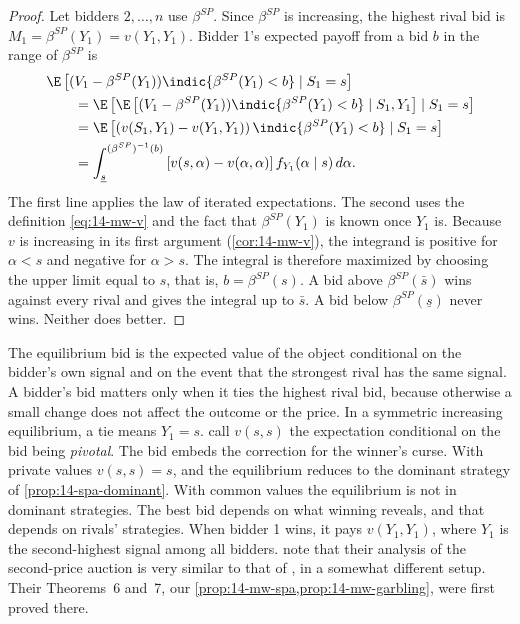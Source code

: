 \begin{proof}
Let bidders $2,\dots,n$ use $\beta^{SP}$. Since $\beta^{SP}$ is increasing, the highest rival bid is
$M_1=\beta^{SP}(Y_1)=v(Y_1,Y_1)$. Bidder 1's expected payoff from a bid $b$ in the range of $\beta^{SP}$ is
\begin{align*}
  &\E\left[(V_1-\beta^{SP}(Y_1))\indic\{\beta^{SP}(Y_1)<b\}\mid S_1=s\right]\\
  &\qquad=\E\left[\E\left[(V_1-\beta^{SP}(Y_1))\indic\{\beta^{SP}(Y_1)<b\}\mid S_1,Y_1\right]\mid S_1=s\right]\\
  &\qquad=\E\left[\left(v(S_1,Y_1)-v(Y_1,Y_1)\right)\indic\{\beta^{SP}(Y_1)<b\}\mid S_1=s\right]\\
  &\qquad=\int_{\underline s}^{(\beta^{SP})^{-1}(b)}\left[v(s,\alpha)-v(\alpha,\alpha)\right]f_{Y_1}(\alpha\mid s)\,d\alpha.
\end{align*}
The first line applies the law of iterated expectations. The second uses the definition \eqref{eq:14-mw-v}
and the fact that $\beta^{SP}(Y_1)$ is known once $Y_1$ is. Because $v$ is increasing in its first argument
(\cref{cor:14-mw-v}), the integrand is positive for $\alpha<s$ and negative for $\alpha>s$. The integral is
therefore maximized by choosing the upper limit equal to $s$, that is, $b=\beta^{SP}(s)$. A bid above
$\beta^{SP}(\bar s)$ wins against every rival and gives the integral up to $\bar s$. A bid below
$\beta^{SP}(\underline s)$ never wins. Neither does better.
\end{proof}

The equilibrium bid is the expected value of the object conditional on the bidder's own signal and on the
event that the strongest rival has the same signal. A bidder's bid matters only when it ties the highest rival
bid, because otherwise a small change does not affect the outcome or the price. In a symmetric increasing
equilibrium, a tie means $Y_1=s$. \citet[eq.~(2.3)]{AtheyHaile2007} call $v(s,s)$ the expectation
conditional on the bid being \emph{pivotal}. The bid embeds the correction for the winner's curse. With
private values $v(s,s)=s$, and the equilibrium reduces to the dominant strategy of \cref{prop:14-spa-dominant}.
With common values the equilibrium is not in dominant strategies. The best bid depends on what winning
reveals, and that depends on rivals' strategies. When bidder 1 wins, it pays $v(Y_1,Y_1)$, where $Y_1$ is the
second-highest signal among all bidders.  note that their analysis
of the second-price auction is very similar to that of \citet{Milgrom1981a}, in a somewhat different setup.
Their Theorems~6 and~7, our \cref{prop:14-mw-spa,prop:14-mw-garbling}, were first proved there.

